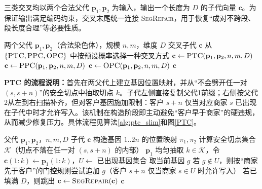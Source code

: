 三类交叉均以两个合法父代 $\mathbf{p}_1,\mathbf{p}_2$ 为输入，输出一个长度为 $D$ 的子代向量 $\mathbf{c}$。为保证输出满足编码约束，交叉末尾统一连接 \textsc{SegRepair}，用于恢复“成对不跨段、段长度合理”等必要性质。

\begin{algorithm}[H]
	\caption{SegX（\textsc{PTC}/\textsc{PPC}/\textsc{OPC} 三交叉框架）}
	\label{alg:segx}
	\begin{algorithmic}[1]
		\REQUIRE 两个父代 $\mathbf{p}_1,\mathbf{p}_2$（合法染色体），规模 $n,m$，维度 $D$
		\ENSURE 交叉子代 $\mathbf{c}$
		\STATE 从 $\{\textsc{PTC},\textsc{PPC},\textsc{OPC}\}$ 中按预设概率选择一种交叉方式
		\STATE $\mathbf{c} \leftarrow \textsc{PTC}(\mathbf{p}_1,\mathbf{p}_2,n,m,D)$
		\STATE $\mathbf{c} \leftarrow \textsc{PPC}(\mathbf{p}_1,\mathbf{p}_2,n,m,D)$
		\ELSE
		\STATE $\mathbf{c} \leftarrow \textsc{OPC}(\mathbf{p}_1,\mathbf{p}_2,n,m,D)$
		\ENDIF
		\RETURN $\mathbf{c}$
	\end{algorithmic}
\end{algorithm}

\noindent\textbf{PTC 的流程说明：}首先在两父代上建立基因位置映射，并从“不会劈开任一对 $(s,s{+}n)$”的安全切点中抽取切点 $k$。子代左侧直接复制父代1前缀；右侧按父代2从左到右扫描补齐，但对客户基因施加限制：客户 $s{+}n$ 仅当对应商家 $s$ 已出现在子代中时才允许写入。该机制在构造阶段即主动避免“客户早于商家”的硬违规，从而减少修复压力。具体流程见算法\ref{alg:ptc_slim}和图\ref{PTC}。

\begin{algorithm}[H]
	\caption{PTC：位置追踪交叉}
	\label{alg:ptc_slim}
	\begin{algorithmic}[1]
		\REQUIRE 父代 $\mathbf{p}_1,\mathbf{p}_2$，$n,m,D$
		\ENSURE 子代 $\mathbf{c}$
		\STATE 构造基因 $1..2n$ 的位置映射 $\pi_1,\pi_2$
		\STATE 计算安全切点集合 $\mathcal{K}$（切点不落在任一对 $(s,s{+}n)$ 的内部）
		\RETURN $\mathbf{p}_1$
		\ENDIF
		\STATE 均匀抽取 $k\in\mathcal{K}$，令 $\mathbf{c}(1{:}k)\leftarrow \mathbf{p}_1(1{:}k)$，$U\leftarrow$ 已出现基因集合
		\STATE 取当前基因 $g$
		\STATE 若 $g\notin U$，则按“商家先于客户”的门控规则尝试追加 $g$（客户 $s{+}n$ 仅当商家 $s\in U$ 时允许写入）
		\STATE 若已填满 $D$，则跳出
		\ENDFOR
		\STATE $\mathbf{c} \leftarrow \textsc{SegRepair}(\mathbf{c})$
		\RETURN $\mathbf{c}$
	\end{algorithmic}
\end{algorithm}
\vspace{-0.25em}

